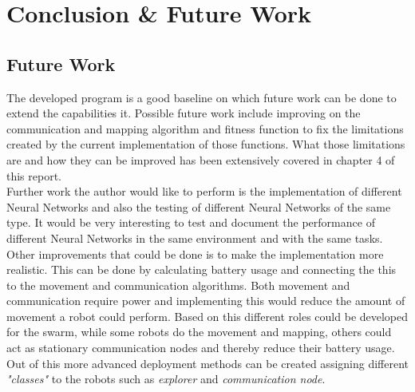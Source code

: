 \chapter{Conclusion \& Future Work}

\section{Future Work}
The developed program is a good baseline on which future work can be done to extend the capabilities it. 
Possible future work include improving on the communication and mapping algorithm and fitness function to fix the limitations created by the current implementation of those functions. 
What those limitations are and how they can be improved has been extensively covered in chapter 4 of this report.\\

Further work the author would like to perform is the implementation of different Neural Networks and also the testing of different Neural Networks of the same type.
It would be very interesting to test and document the performance of different Neural Networks in the same environment and with the same tasks.\\

Other improvements that could be done is to make the implementation more realistic.
This can be done by calculating battery usage and connecting the this to the movement and communication algorithms. Both movement and communication require power and implementing this would reduce the amount of movement a robot could perform. 
Based on this different roles could be developed for the swarm, while some robots do the movement and mapping, others could act as stationary communication nodes and thereby reduce their battery usage. 
Out of this more advanced deployment methods can be created assigning different \textit{"classes"} to the robots such as \textit{explorer} and \textit{communication node}. \\

